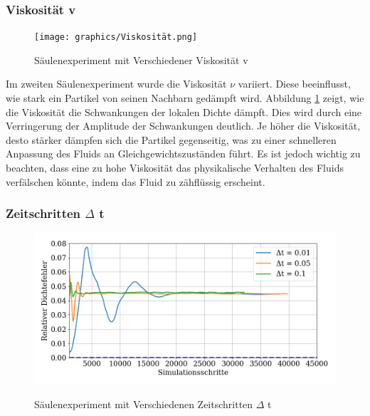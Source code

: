 \documentclass[a4paper, 12pt]{article}
\begin{document}
\subsubsection{Viskosität v}
\begin{figure}[H]
	\centering
	\texttt{[image: graphics/Viskosität.png]}	
	\caption{Säulenexperiment mit Verschiedener Viskosität v}
	\label{Säulenexperiment_v}
\end{figure}

Im zweiten Säulenexperiment wurde die Viskosität \(\nu\) variiert. Diese beeinflusst, wie stark ein Partikel von seinen Nachbarn gedämpft wird. Abbildung \ref{Säulenexperiment_v} zeigt, wie die Viskosität die Schwankungen der lokalen Dichte dämpft. Dies wird durch eine Verringerung der Amplitude der Schwankungen deutlich. Je höher die Viskosität, desto stärker dämpfen sich die Partikel gegenseitig, was zu einer schnelleren Anpassung des Fluids an Gleichgewichtszuständen führt. Es ist jedoch wichtig zu beachten, dass eine zu hohe Viskosität das physikalische Verhalten des Fluids verfälschen könnte, indem das Fluid zu zähflüssig erscheint.

\subsubsection{Zeitschritten $\Delta$ t}
\begin{figure}[H]
	\centering
	\includegraphics[width=.85\textwidth]{graphics/Zeitschritt.png}	
	\label{Säulenexperiment_t}
	\caption{Säulenexperiment mit Verschiedenen Zeitschritten $\Delta$ t}
\end{figure}
\end{document}
